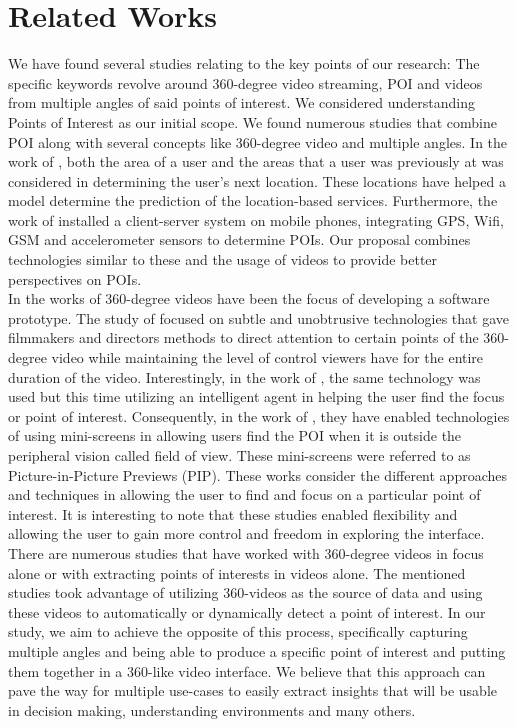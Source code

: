 \documentclass{sigchi}
\begin{document}
\section{Related Works}
We have found several studies relating to the key points of our research: The specific keywords revolve around 360-degree video streaming, POI and videos from multiple angles of said points of interest. We considered understanding Points of Interest as our initial scope. We found numerous studies that combine POI along with several concepts like 360-degree video and multiple angles. In the work of \cite{molegi2018regions}, both the area of a user and the areas that a user was previously at was considered in determining the user's next location. These locations have helped a model determine the prediction of the location-based services. Furthermore, the work of \cite{montoliu2013discovering} installed a client-server system on mobile phones, integrating GPS, Wifi, GSM and accelerometer sensors to determine POIs. Our proposal combines technologies similar to these and the usage of videos to provide better perspectives on POIs.\\
In the works of \cite{sheikh2016directing, su2017making, lin2017outside} 360-degree videos have been the focus of developing a software prototype. The study of \cite{sheikh2016directing} focused on subtle and unobtrusive technologies that gave filmmakers and directors methods to direct attention to certain points of the 360-degree video while maintaining the level of control viewers have for the entire duration of the video. Interestingly, in the work of \cite{su2017making}, the same technology was used but this time utilizing an intelligent agent in helping the user find the focus or point of interest. Consequently, in the work of \cite{lin2017outside}, they have enabled technologies of using mini-screens in allowing users find the POI when it is outside the peripheral vision called field of view. These mini-screens were referred to as Picture-in-Picture Previews (PIP). These works consider the different approaches and techniques in allowing the user to find and focus on a particular point of interest. It is interesting to note that these studies enabled flexibility and allowing the user to gain more control and freedom in exploring the interface. There are numerous studies that have worked with 360-degree videos in focus alone or with extracting points of interests in videos alone. The mentioned studies took advantage of utilizing 360-videos as the source of data and using these videos to automatically or dynamically detect a point of interest. In our study, we aim to achieve the opposite of this process, specifically capturing multiple angles and being able to produce a specific point of interest and putting them together in a 360-like video interface. We believe that this approach can pave the way for multiple use-cases to easily extract insights that will be usable in decision making, understanding environments and many others. 
\end{document}
